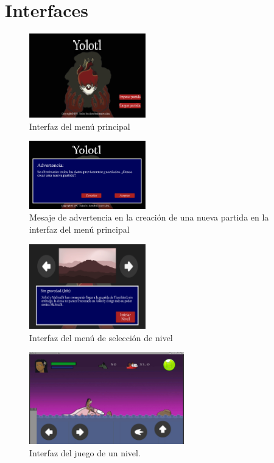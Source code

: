 \section{Interfaces}\label{Anexo:Intefaces}

\begin{figure}[H]
    \centering
    \includegraphics[width=0.45\textwidth]{Anexos/Interfaces/menu01.png}
    \caption{Interfaz del menú principal}
    \label{fig:menuP}
\end{figure}

\begin{figure}[H]
    \centering
    \includegraphics[width=0.45\textwidth]{Anexos/Interfaces/menu02.png}
    \caption{Mesaje de advertencia en la creación de una nueva partida en la interfaz del 
    menú principal}
    \label{fig:menuP02}
\end{figure}

\begin{figure}[H]
    \centering
    \includegraphics[width=0.45\textwidth]{Anexos/Interfaces/menu03.png}
    \caption{Interfaz del menú de selección de nivel}
    \label{fig:menuP03}
\end{figure}

\begin{figure}[H]
    \centering
    \includegraphics[width=0.6\textwidth]{Anexos/Interfaces/InterfazJuego01.png}
    \caption{Interfaz del juego de un nivel.}
    \label{fig:Game01}
\end{figure}

